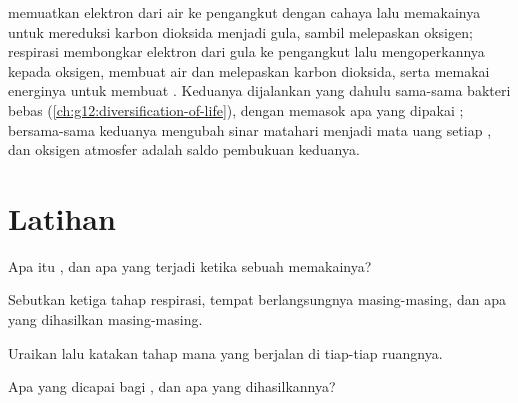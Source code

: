\begin{remark}\label{rem:g12:respiration-fermentation:mirror}
 memuatkan elektron dari air ke pengangkut dengan cahaya
lalu memakainya untuk mereduksi karbon dioksida menjadi gula, sambil
melepaskan oksigen; respirasi membongkar elektron dari gula ke
pengangkut lalu mengoperkannya kepada oksigen, membuat air dan
melepaskan karbon dioksida, serta memakai energinya untuk membuat .
Keduanya dijalankan  yang dahulu sama-sama bakteri bebas
(\cref{ch:g12:diversification-of-life}), dengan  memasok apa
yang dipakai ; bersama-sama keduanya mengubah sinar matahari
menjadi mata uang setiap , dan oksigen atmosfer adalah saldo
pembukuan keduanya.
\end{remark}

\section{Latihan}

\begin{exercise}[$\star$]\label{exo:g12:respiration-fermentation:1}
Apa itu , dan apa yang terjadi ketika sebuah  memakainya?
\end{exercise}

\begin{exercise}[$\star$]\label{exo:g12:respiration-fermentation:2}
Sebutkan ketiga tahap respirasi, tempat berlangsungnya
masing-masing, dan apa yang dihasilkan masing-masing.
\end{exercise}

\begin{exercise}[$\star$]\label{exo:g12:respiration-fermentation:3}
Uraikan  lalu katakan tahap mana yang berjalan di
tiap-tiap ruangnya.
\end{exercise}

\begin{exercise}[$\star$]\label{exo:g12:respiration-fermentation:4}
Apa yang dicapai  bagi , dan apa yang dihasilkannya?
\end{exercise}

